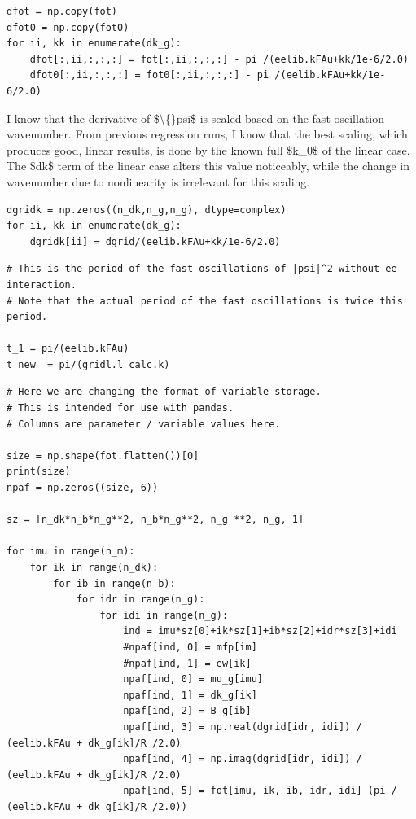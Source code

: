 \documentclass{article}
\begin{document}
\begin{lstlisting}
dfot = np.copy(fot)
dfot0 = np.copy(fot0)
for ii, kk in enumerate(dk_g):
    dfot[:,ii,:,:,:] = fot[:,ii,:,:,:] - pi /(eelib.kFAu+kk/1e-6/2.0)
    dfot0[:,ii,:,:,:] = fot0[:,ii,:,:,:] - pi /(eelib.kFAu+kk/1e-6/2.0)\end{lstlisting}

I know that the derivative of \$\textbackslash\{\}psi\$ is scaled based on the fast oscillation wavenumber. From previous regression runs, I know that the best scaling, which produces good, linear results, is done by the known full \$k\_0\$ of the linear case. The \$dk\$ term of the linear case alters this value noticeably, while the change in wavenumber due to nonlinearity is irrelevant for this scaling.

\begin{lstlisting}
dgridk = np.zeros((n_dk,n_g,n_g), dtype=complex)
for ii, kk in enumerate(dk_g):
    dgridk[ii] = dgrid/(eelib.kFAu+kk/1e-6/2.0)\end{lstlisting}

\begin{lstlisting}
# This is the period of the fast oscillations of |psi|^2 without ee interaction.
# Note that the actual period of the fast oscillations is twice this period.

t_1 = pi/(eelib.kFAu)
t_new  = pi/(gridl.l_calc.k)\end{lstlisting}

\begin{lstlisting}
# Here we are changing the format of variable storage.
# This is intended for use with pandas.
# Columns are parameter / variable values here.

size = np.shape(fot.flatten())[0]
print(size)
npaf = np.zeros((size, 6))

sz = [n_dk*n_b*n_g**2, n_b*n_g**2, n_g **2, n_g, 1]

for imu in range(n_m):
    for ik in range(n_dk):
        for ib in range(n_b):
            for idr in range(n_g):
                for idi in range(n_g):
                    ind = imu*sz[0]+ik*sz[1]+ib*sz[2]+idr*sz[3]+idi
                    #npaf[ind, 0] = mfp[im]
                    #npaf[ind, 1] = ew[ik]
                    npaf[ind, 0] = mu_g[imu]
                    npaf[ind, 1] = dk_g[ik]
                    npaf[ind, 2] = B_g[ib]
                    npaf[ind, 3] = np.real(dgrid[idr, idi]) / (eelib.kFAu + dk_g[ik]/R /2.0)
                    npaf[ind, 4] = np.imag(dgrid[idr, idi]) / (eelib.kFAu + dk_g[ik]/R /2.0)
                    npaf[ind, 5] = fot[imu, ik, ib, idr, idi]-(pi / (eelib.kFAu + dk_g[ik]/R /2.0))\end{lstlisting}
\end{document}
